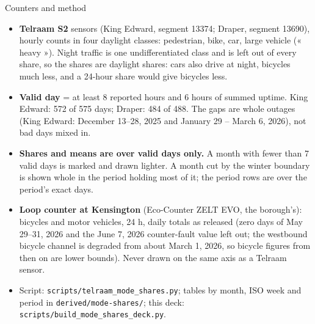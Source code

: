 \documentclass[aspectratio=169,10pt]{beamer}\usetheme{default}\usecolortheme{seahorse}\setbeamertemplate{navigation symbols}{}\setbeamertemplate{footline}[frame number]
\begin{document}
\begin{frame}{Counters and method}\begin{itemize}
\item \textbf{Telraam S2} sensors (King Edward, segment 13374; Draper, segment 13690), hourly counts in four daylight classes: pedestrian, bike, car, large vehicle (« heavy »). Night traffic is one undifferentiated class and is left out of every share, so the shares are daylight shares: cars also drive at night, bicycles much less, and a 24-hour share would give bicycles less.
\item \textbf{Valid day} = at least 8 reported hours and 6 hours of summed uptime. King Edward: 572 of 575 days; Draper: 484 of 488. The gaps are whole outages (King Edward: December 13--28, 2025 and January 29 -- March 6, 2026), not bad days mixed in.
\item \textbf{Shares and means are over valid days only.} A month with fewer than 7 valid days is marked \dag{} and drawn lighter. A month cut by the winter boundary is shown whole in the period holding most of it; the period rows are over the period\textquoteright{}s exact days.
\item \textbf{Loop counter at Kensington} (Eco-Counter ZELT EVO, the borough\textquoteright{}s): bicycles and motor vehicles, 24 h, daily totals as released (zero days of May 29--31, 2026 and the June 7, 2026 counter-fault value left out; the westbound bicycle channel is degraded from about March 1, 2026, so bicycle figures from then on are lower bounds). Never drawn on the same axis as a Telraam sensor.
\item Script: \texttt{scripts/telraam\_mode\_shares.py}; tables by month, ISO week and period in \texttt{derived/mode-shares/}; this deck: \texttt{scripts/build\_mode\_shares\_deck.py}.
\end{itemize}\end{frame}
\end{document}
